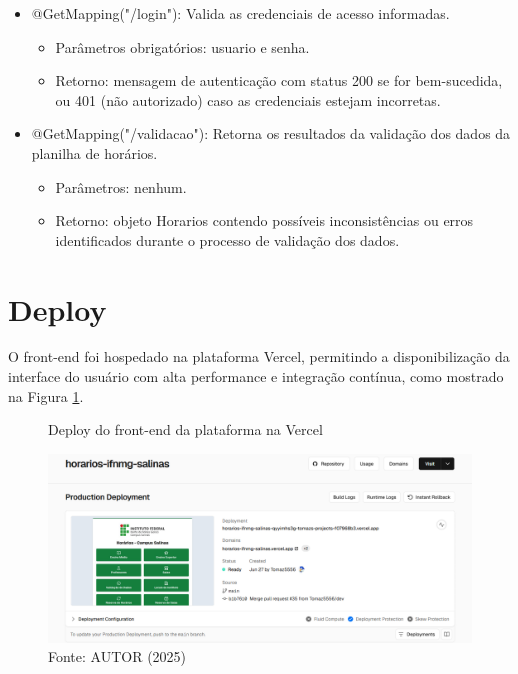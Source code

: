 \begin{itemize}
\begin{itemize}
        \item @GetMapping("/login"): Valida as credenciais de acesso informadas.
        \begin{itemize}
            \item Parâmetros obrigatórios: usuario e senha.
            \item Retorno: mensagem de autenticação com status 200 se for bem-sucedida, ou 401 (não autorizado) caso as credenciais estejam incorretas.
        \end{itemize}
        \item @GetMapping("/validacao"): Retorna os resultados da validação dos dados da planilha de horários.
        \begin{itemize}
            \item Parâmetros: nenhum.
            \item Retorno: objeto Horarios contendo possíveis inconsistências ou erros identificados durante o processo de validação dos dados.
        \end{itemize}
    \end{itemize}
\end{itemize}

\section{Deploy}

O front-end foi hospedado na plataforma Vercel, permitindo a disponibilização da interface do usuário com alta performance e integração contínua, como mostrado na Figura \ref{fig_deploy_1}.

\begin{figure}[H]
    \centering
    \caption{Deploy do front-end da plataforma na Vercel}
    \includegraphics[width=1\textwidth]{Figuras/deploy-1.png}
    \caption*{Fonte: AUTOR (2025)}
    \label{fig_deploy_1}
\end{figure}

